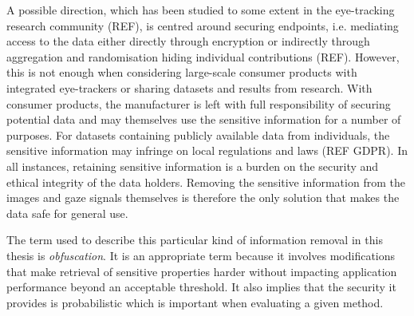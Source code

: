 A possible direction, which has been studied to some extent in the eye-tracking research community (REF), is centred around securing endpoints, i.e. mediating access to the data either directly through encryption or indirectly through aggregation and randomisation hiding individual contributions (REF). However, this is not enough when considering large-scale consumer products with integrated eye-trackers or sharing datasets and results from research. With consumer products, the manufacturer is left with full responsibility of securing potential data and may themselves use the sensitive information for a number of purposes. For datasets containing publicly available data from individuals, the sensitive information may infringe on local regulations and laws (REF GDPR). In all instances, retaining sensitive information is a burden on the security and ethical integrity of the data holders. Removing the sensitive information from the images and gaze signals themselves is therefore the only solution that makes the data safe for general use.

The term used to describe this particular kind of information removal in this thesis is \emph{obfuscation}. It is an appropriate term because it involves modifications that make retrieval of sensitive properties harder without impacting application performance beyond an acceptable threshold. It also implies that the security it provides is probabilistic which is important when evaluating a given method.








